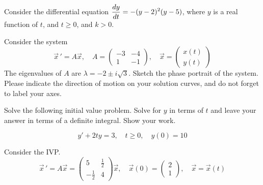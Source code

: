 \documentclass[12pt]{exam}
\begin{document}
\begin{questions}
    \newpage 
    
    \question[10] %
    Consider the differential equation $\displaystyle {\frac{dy}{dt}} = - (y-2)^2(y-5)$, where $y$ is a real function of $t$, and $t \ge 0$, and $k>0$. 
    
    
    \newpage \Initials
    
    \question[3]  Consider the system $$\vec x \, ' = A\vec x, \quad A = \begin{pmatrix} -3&-4\\1&-1 \end{pmatrix}, \quad \vec x = \begin{pmatrix} x(t)\\y(t)\end{pmatrix} $$ The eigenvalues of $A$ are $\lambda = -2\pm i\sqrt 3$. Sketch the phase portrait of the system. Please indicate the direction of motion on your solution curves, and do not forget to label your axes.     
    
    \vspace{5cm}
    
    \question[5] Solve the following initial value problem. Solve for $y$ in terms of $t$ and leave your answer in terms of a definite integral. Show your work. 
    
    $$y' + 2ty = 3, \quad t \ge 0, \quad y(0) = 10$$

    


    \newpage \Initials
    
    \question[10] Consider the IVP. $$\vec x \, ' = A \vec x =  \begin{pmatrix} 5&\frac12\\-\frac12&4 \end{pmatrix} \vec x, \quad \vec x(0) = \begin{pmatrix} 2 \\1 \end{pmatrix}, \quad \vec x = \vec x(t)$$
 	

\end{questions}
\end{document}

